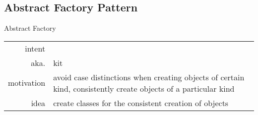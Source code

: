 %	

\subsection{Abstract Factory Pattern}
\begin{frame}{\insertsubsection}
	\begin{fancycolumns}
		\begin{definition}{Abstract Factory \mysource{\gof}}
			\setlength\tabcolsep{1mm}
			\begin{tabularx}{\textwidth}{rX}				
				intent & \mycite{Provide an interface for creating families of related or dependent objects without specifying their concrete classes.}\\
				aka. & kit\\
				motivation & avoid case distinctions when creating objects of certain kind, consistently create objects of a particular kind\\
				idea & create classes for the consistent creation of objects
			\end{tabularx}
		\end{definition}
		\nextcolumn
	\end{fancycolumns}
\end{frame}



